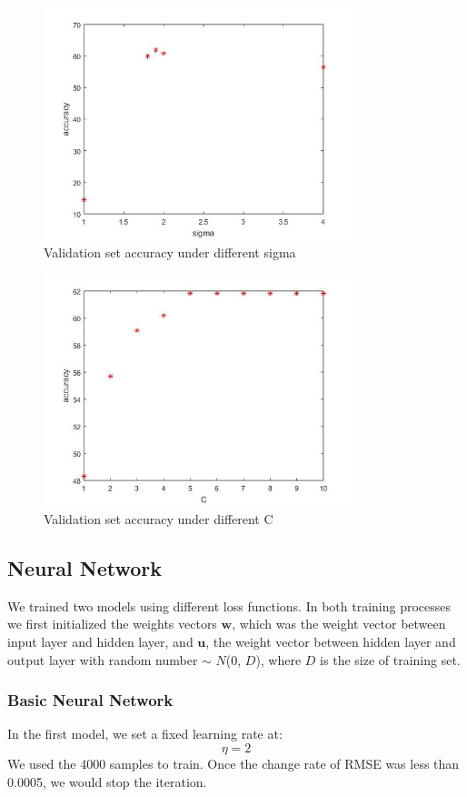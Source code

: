 \documentclass{article} %
\begin{document}
\begin{figure}[ht!]
	\centering
	\includegraphics[width=90mm]{sigma.jpg}
	\caption{Validation set accuracy under different sigma\label{figure1}}
\end{figure}

\begin{figure}[ht!]
	\centering
	\includegraphics[width=90mm]{C.jpg}
	\caption{Validation set accuracy under different C\label{figure2}}
\end{figure}

\subsection{Neural Network}
We trained two models using different loss functions. In both training processes we first initialized the weights vectors $\mathbf{w}$, which was the weight vector between input layer and hidden layer, and $\mathbf{u}$, the weight vector between hidden layer and output layer with random number $\sim$ $N$(0, $D$), where $D$ is the size of training set. 
\subsubsection{Basic Neural Network}
In the first model, we set a fixed learning rate at:
\begin{equation}
\eta = 2
\end{equation}
We used the 4000 samples to train. Once the change rate of RMSE was less than 0.0005, we would stop the iteration. 
\end{document}
